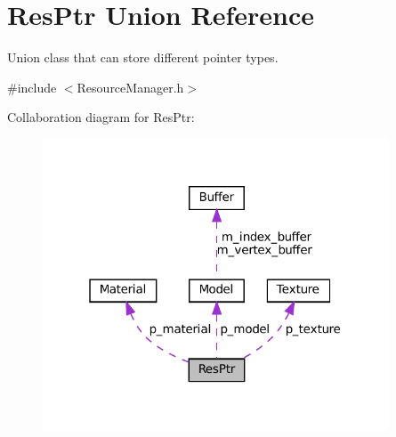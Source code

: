 \hypertarget{unionResPtr}{}\section{Res\+Ptr Union Reference}
\label{unionResPtr}


Union class that can store different pointer types.  




{\ttfamily \#include $<$Resource\+Manager.\+h$>$}



Collaboration diagram for Res\+Ptr\+:\nopagebreak
\begin{figure}[H]
\begin{center}
\leavevmode
\includegraphics[width=292pt]{unionResPtr__coll__graph}
\end{center}
\end{figure}

